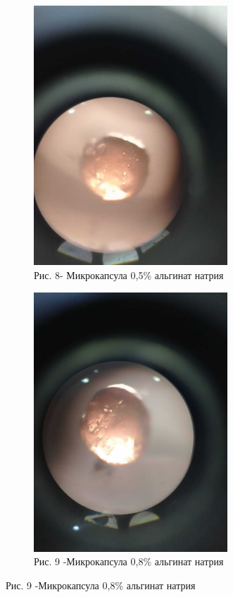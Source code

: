\begin{figure}[H]
	\centering
	\begin{subfigure}[b]{0.45\textwidth}
		\centering
		\includegraphics[width=0.8\textwidth]{assets/323}
		\caption*{Рис. 8- Микрокапсула 0,5\% альгинат натрия}
	\end{subfigure}
	\hfill
	\begin{subfigure}[b]{0.45\textwidth}
		\centering
		\includegraphics[width=0.8\textwidth]{assets/324}
		\caption*{Рис. 9 -Микрокапсула 0,8\% альгинат натрия}
	\end{subfigure}
	
\end{figure}



